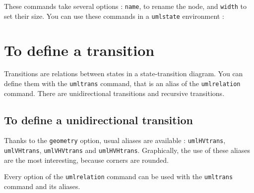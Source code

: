 \documentclass[a4paper,11pt]{report}
\newcommand{\inputTikZ}[1]{%
  }%
\newcommand{\inputTikZ}[1]{%
    \texttt{[image: fig/\#1.pdf]}%
  }%
\begin{document}
\medskip

These commands take several options : {\tt name}, to rename the node, and {\tt width} to set their size. You can use these commands in a {\tt umlstate} environment :

\medskip

\begin{minipage}{0.51\textwidth}

\end{minipage}
\begin{minipage}{0.49\textwidth}
\begin{center}
\inputTikZ{statename}
\end{center}
\end{minipage}

\medskip

\section{To define a transition}\label{s.trans}

Transitions are relations between states in a state-transition diagram. You can define them with the {\tt umltrans} command, that is an alias of the {\tt umlrelation} command. There are unidirectional transitions and recursive transitions.

\subsection{To define a unidirectional transition}\label{s.unitrans}

Thanks to the {\tt geometry} option, usual aliases are available : {\tt umlHVtrans}, {\tt umlVHtrans}, {\tt umlVHVtrans} and {\tt umlHVHtrans}. Graphically, the use of these aliases are the most interesting, because corners are rounded.

\medskip

\begin{minipage}{0.51\textwidth}

\end{minipage}
\begin{minipage}{0.49\textwidth}
\begin{center}
\inputTikZ{transition}
\end{center}
\end{minipage}

\medskip

Every option of the {\tt umlrelation} command can be used with the {\tt umltrans} command and its aliases.
\end{document}
